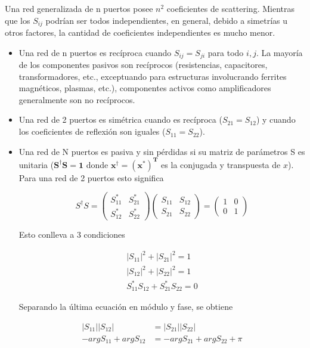 Una red generalizada de n puertos posee $n^2$ coeficientes de scattering. Mientras que los $S_{ij}$ podrían ser todos independientes,
en general, debido a simetrías u otros factores, la cantidad de coeficientes independientes es mucho menor.
\begin{itemize}
	\item Una red de n puertos es recíproca cuando $S_{ij} = S_{ji}$ para todo $i, j$. La mayoría de los componentes pasivos son 
		recíprocos (resistencias, capacitores, transformadores, etc., exceptuando para estructuras involucrando ferrites magnéticos,
		plasmas, etc.), componentes activos como amplificadores generalmente son no recíprocos.
	\item Una red de 2 puertos es simétrica cuando es recíproca ($S_{21} = S_{12}$) y cuando los coeficientes de reflexión son iguales
		($S_{11} = S_{22}$).
	\item Una red de N puertos es pasiva y sin pérdidas si su matriz de parámetros S es unitaria ($\mathbf{S^{\dagger}S = 1}$ donde 
		$\mathbf{x^{\dagger} = (x^*)^T}$ es la conjugada y transpuesta de $x$). Para una red de 2 puertos esto significa

\begin{equation}
S^{\dagger}S = \begin{pmatrix} S_{11}^* & S_{21}^*\\S_{12}^* & S_{22}^* \end{pmatrix}
			\begin{pmatrix} S_{11} & S_{12}\\S_{21} & S_{22} \end{pmatrix} = \begin{pmatrix} 1 & 0\\0 & 1 \end{pmatrix}
\end{equation}

Esto conlleva a 3 condiciones 

\begin{equation}
\begin{aligned}
	|S_{11}|^2 + |S_{21}|^2 = 1 \\
	|S_{12}|^2 + |S_{22}|^2 = 1 \\
	S_{11}^*S_{12} + S_{21}^*S_{22} = 0
\end{aligned}
\label{eq:sCondition}
\end{equation}

Separando la última ecuación en módulo y fase, se obtiene

\begin{equation}
\begin{aligned}
	|S_{11}||S_{12}| &= |S_{21}||S_{22}| \\
	-argS_{11} + argS_{12} &= -argS_{21} + argS_{22} + \pi
\end{aligned}
\label{eq:con}
\end{equation}


\end{itemize}
